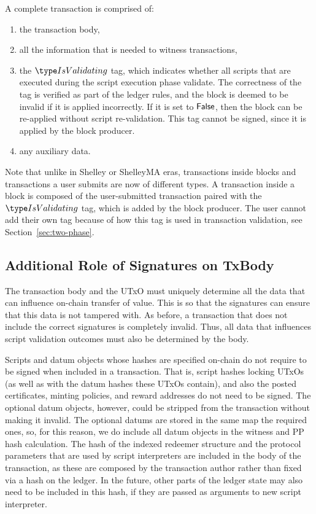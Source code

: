 A complete transaction is comprised of:

\begin{enumerate}
  \item the transaction body,
  \item all the information that is needed to witness transactions,
  \item the $\IsValidating$ tag, which indicates whether all scripts
  that are executed during the script execution phase validate.
  The correctness of the tag is verified as part of the ledger rules, and the block is
  deemed to be invalid if it is applied incorrectly.
  If it is set to $\mathsf{False}$, then the block can be re-applied without script re-validation.
  This tag cannot be signed, since it is applied by the block producer.
  \item any auxiliary data.
\end{enumerate}

Note that unlike in Shelley or ShelleyMA eras, transactions inside blocks and transactions
a user submits are now of different types. A transaction inside a block is composed of
the user-submitted transaction paired with the $\IsValidating$ tag, which is
added by the block producer. The user cannot
add their own tag because of how this tag is used in transaction validation, see
Section~\ref{sec:two-phase}.

\subsection{Additional Role of Signatures on TxBody}

The transaction body and the UTxO must uniquely determine all the data
that can influence on-chain transfer of value.
This is so that the signatures can ensure that this data is not tampered with.
As before, a transaction that does not include the correct signatures is completely invalid.
Thus, all data that influences script validation outcomes must also be determined by the body.

Scripts and datum objects whose hashes are specified on-chain do not require to be
signed when included in a transaction. That is, script hashes locking UTxOs (as well as
with the datum hashes these UTxOs contain), and also the posted
certificates, minting policies, and reward addresses do not need to be signed.
The optional datum objects, however, could be stripped from the transaction without making
it invalid. The optional datums are stored in the same map the required ones, so,
for this reason, we do include all datum objects in the witness and PP hash calculation.
%
The hash of the indexed redeemer structure and the protocol parameters that are used by
script interpreters are included in the body of the transaction, as these are composed
by the transaction author rather than
fixed via a hash on the ledger. In the future, other parts of the ledger
state may also need to be included in this hash, if they are passed as
arguments to new script interpreter.

